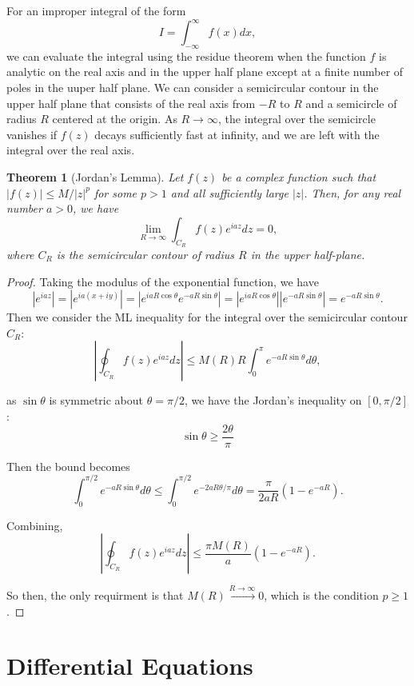 \documentclass{article}
\newtheorem{theorem}{Theorem}[section]
\begin{document}
For an improper integral of the form
\begin{equation}
    I = \int_{-\infty}^{\infty} f(x) dx,
\end{equation}
we can evaluate the integral using the residue theorem when the function $f$ is analytic on the real axis and in the upper half plane except at a finite number of poles in the uuper half plane. We can consider a semicircular contour in the upper half plane that consists of the real axis from $-R$ to $R$ and a semicircle of radius $R$ centered at the origin. As $R \to \infty$, the integral over the semicircle vanishes if $f(z)$ decays sufficiently fast at infinity, and we are left with the integral over the real axis.

\begin{theorem}[Jordan's Lemma]
    Let $f(z)$ be a complex function such that $|f(z)| \leq M/|z|^p$ for some $p > 1$ and all sufficiently large $|z|$. Then, for any real number $a > 0$, we have
    \begin{equation}
        \lim_{R \to \infty} \int_{C_R} f(z) e^{iaz} dz = 0,
    \end{equation}
    where $C_R$ is the semicircular contour of radius $R$ in the upper half-plane.
\end{theorem}

\begin{proof}
    Taking the modulus of the exponential function, we have
    \begin{equation}
        |e^{iaz}| = |e^{ia(x+iy)}| = |e^{iaR\cos\theta} e^{-aR\sin\theta}| = |e^{iaR\cos\theta}| |e^{-aR\sin\theta}| = e^{-aR\sin\theta}.
    \end{equation}
Then we consider the ML inequality for the integral over the semicircular contour $C_R$:
\begin{equation}
    \left|\oint_{C_R} f(z)e^{iaz}dz\right| \leq M(R)R\int_0^\pi e^{-aR\sin\theta}d\theta,
    \end{equation}

    as $\sin\theta$ is symmetric about $\theta = \pi /2 $, we have the Jordan's inequality on $[0, \pi/2]$ :
    \begin{equation}
        \sin\theta \geq \frac{2\theta}{\pi}
    \end{equation}

    Then the bound becomes
    \begin{equation}
        \int_0^{\pi/2} e^{-aR\sin\theta}d\theta \leq \int_0^{\pi/2} e^{-2aR\theta/\pi} d\theta = \frac{\pi}{2aR}\left(1-e^{-aR}\right).
    \end{equation}

    Combining,
    \begin{equation}
        \left|\oint_{C_R} f(z)e^{iaz} dz\right| \leq \frac{\pi M(R)}{a}\left(1-e^{-aR}\right).
    \end{equation}

    So then, the only requirment is that $M(R)\xrightarrow{R\to\infty} 0$, which is the condition $p\geq 1$.
\end{proof}
\section{Differential Equations}
\end{document}
